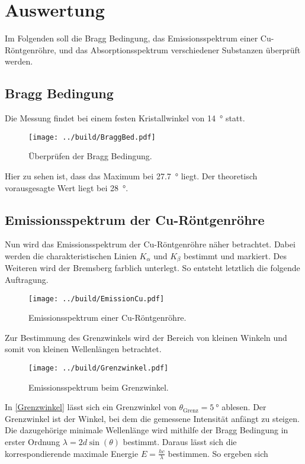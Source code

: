 


\section{Auswertung}
\label{sec:Auswertung}

Im Folgenden soll die Bragg Bedingung, das Emissionsspektrum einer Cu-Röntgenröhre, und das Absorptionsspektrum verschiedener Substanzen überprüft 
werden. 

\subsection{Bragg Bedingung}
Die Messung findet bei einem festen Kristallwinkel von \qty{14}{\degree} statt.

\begin{figure}[H]
    \centering
    \texttt{[image: ../build/BraggBed.pdf]}
    \caption{Überprüfen der Bragg Bedingung.}
\end{figure}    

\noindent Hier zu sehen ist, dass das Maximum bei \qty{27.7}{\degree} liegt. Der theoretisch vorausgesagte Wert liegt bei \qty{28}{\degree}.  
    
\subsection{Emissionsspektrum der Cu-Röntgenröhre}
Nun wird das Emissionsspektrum der Cu-Röntgenröhre näher betrachtet. Dabei werden die charakteristischen Linien $K_\alpha$ und $K_\beta$ bestimmt 
und markiert. Des Weiteren wird der Bremsberg farblich unterlegt. So entsteht letztlich die folgende Auftragung. 

\begin{figure}[H]
    \centering
    \texttt{[image: ../build/EmissionCu.pdf]}
    \caption{Emissionsspektrum einer Cu-Röntgenröhre.}
\end{figure}    

\noindent Zur Bestimmung des Grenzwinkels wird der Bereich von kleinen Winkeln und somit von kleinen Wellenlängen betrachtet. 

\begin{figure}[H]
    \centering
    \texttt{[image: ../build/Grenzwinkel.pdf]}
    \caption{Emissionsspektrum beim Grenzwinkel.}
    \label{Grenzwinkel}
\end{figure}    

\noindent In \autoref{Grenzwinkel} lässt sich ein Grenzwinkel von $\theta_\text{Grenz} = \qty{5}{\degree}$ ablesen. Der Grenzwinkel ist der Winkel, 
bei dem die gemessene Intensität anfängt zu steigen. Die dazugehörige minimale 
Wellenlänge wird mithilfe der Bragg Bedingung in erster Ordnung $\lambda=2 d \sin(\theta)$ bestimmt. Daraus lässt sich die korrespondierende maximale 
Energie $E=\frac{hc}{\lambda}$ bestimmen. So ergeben sich 

